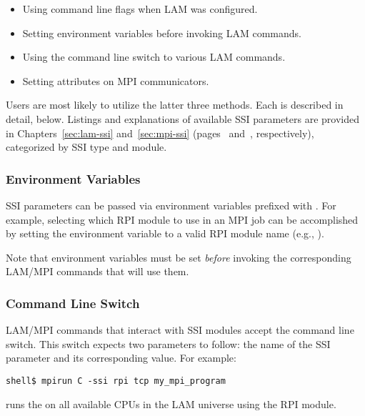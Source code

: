 \begin{itemize}
\item Using command line flags when LAM was configured.
\item Setting environment variables before invoking LAM commands.
\item Using the  command line switch to various LAM
  commands.
\item Setting attributes on MPI communicators.
\end{itemize}

Users are most likely to utilize the latter three methods.  Each is
described in detail, below.  Listings and explanations of available
SSI parameters are provided in Chapters~\ref{sec:lam-ssi}
and~\ref{sec:mpi-ssi} (pages~\pageref{sec:lam-ssi}
and~\pageref{sec:mpi-ssi}, respectively), categorized by SSI type and
module.


\subsubsection{Environment Variables}

SSI parameters can be passed via environment variables prefixed with
.  For example, selecting which RPI module
to use in an MPI job can be accomplished by setting the environment
variable  to a valid RPI module name
(e.g., ).

Note that environment variables must be set {\em before} invoking the
corresponding LAM/MPI commands that will use them.


\subsubsection{ Command Line Switch}

LAM/MPI commands that interact with SSI modules accept the
 command line switch.  This switch expects two parameters
to follow: the name of the SSI parameter and its corresponding value.
For example:

\lstset{style=lam-cmdline}
\begin{lstlisting}
shell$ mpirun C -ssi rpi tcp my_mpi_program
\end{lstlisting}

\noindent runs the  on all available CPUs in
the LAM universe using the  RPI module.

